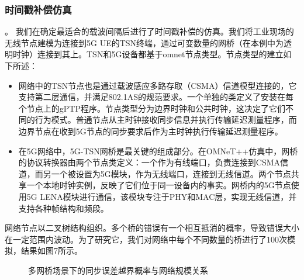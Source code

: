 \documentclass[UTF8,a4paper,12pt]{ctexart}
\numberwithin{equation}{section}
\begin{document}
\subsubsection{时间戳补偿仿真}。
我们在确定最适合的载波间隔后进行了时间戳补偿的仿真。我们将工业现场的无线节点建模为连接到5G UE的TSN终端，通过可变数量的网桥（在本例中为透明时钟）连接到其上。TSN和5G设备都基于omnet节点类型。节点类型的建立如下所述：
\begin{itemize}
	\item 网络中的TSN节点也是通过载波感应多路存取（CSMA）信道模型连接的，它支持第二层通信，并满足802.1AS的规范要求。一个单独的类定义了安装在每个节点上的gPTP程序。节点类型分为边界时钟和公共时钟，这决定了它们不同的行为模式。普通节点从主时钟接收同步信息并执行传输延迟测量程序，而边界节点在收到5G节点的同步要求后作为主时钟执行传输延迟测量程序。
	\item 在5G网络中，5G-TSN网桥是最关键的组成部分。在OMNeT++仿真中，网桥的协议转换器由两个节点类定义：一个作为有线端口，负责连接到CSMA信道，而另一个被设置为5G模块，作为无线端口，连接到无线信道。两个节点共享一个本地时钟实例，反映了它们位于同一设备内的事实。网桥内的5G节点使用5G LENA模块进行通信，该模块专注于PHY和MAC层，实现无线信道，并支持各种帧结构和频段。
\end{itemize}
网络节点以二叉树结构组织。多个桥的错误有一个相互抵消的概率，导致错误大小在一定范围内波动。为了研究它，我们对网络中每个不同数量的桥进行了100次模拟，结果如图7所示。
\begin{figure}[htb] 
	\caption{多网桥场景下的同步误差越界概率与网络规模关系}
\end{figure}
\end{document}
